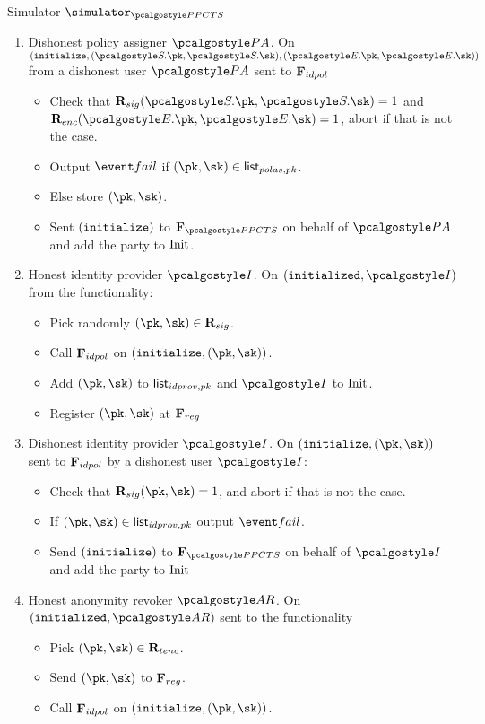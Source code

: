 \documentclass[runningheads,10pt]{llncs}
\numberwithin{equation}{section}
\begin{document}
\begin{simbox}{Simulator $\simulator_{\PPCTS}$}
\begin{enumerate}
  \item Dishonest policy assigner $\polas$. On $(\initialize, (\SIG.\pk, \SIG.\sk), (\ENC.\pk, \ENC.\sk))$ from a
    dishonest user $\polas$ sent to $\mathbf{F}_{{idpol}}$
    \begin{itemize}
    \item Check that $\REL_{sig}(\SIG.\pk, \SIG.\sk) = 1$ and
      $\REL_{enc}(\ENC.\pk, \ENC.\sk) = 1$, abort if that is not the case.
    \item Output $\fail$ if $(\pk, \sk) \in \listvar{polas, pk}$. 
    \item Else store $(\pk, \sk)$.
    \item Sent $(\mathtt{initialize})$ to $\func{\PPCTS}$ on behalf of $\polas$ and add the
      party to $\mathrm{Init}$.
    \end{itemize}

  \item Honest identity provider $\idprov$. On $(\initialized, \idprov)$ from the functionality:
    \begin{itemize}
    \item Pick randomly $(\pk, \sk) \in \REL_{sig}$.
    \item Call $\mathbf{F}_{{idpol}}$ on $(\initialize, (\pk, \sk))$.
    \item Add $(\pk, \sk)$ to ${\mathsf{list}_{idprov, pk}}$ and $\idprov$ to
      $\mathrm{Init}$.
    \item Register $(\pk, \sk)$ at $\mathbf{F}_{{reg}}$
    \end{itemize}

  \item Dishonest identity provider $\idprov$. On $(\initialize, (\pk, \sk))$
    sent to $\mathbf{F}_{{idpol}}$ by a dishonest user $\idprov$:
    \begin{itemize}
    \item Check that $\REL_{sig}(\pk, \sk) = 1$, and abort if that is not the
      case.
    \item If $(\pk, \sk) \in \listvar{idprov, pk}$ output $\fail$. 
    \item Send $(\mathtt{initialize})$ to $\func{\PPCTS}$ on behalf of $\idprov$ and add the
      party to $\mathrm{Init}$
    \end{itemize}

  \item Honest anonymity revoker $\ar$. On $(\initialized, \ar)$ sent to the
    functionality
    \begin{itemize}
    \item Pick $(\pk, \sk) \in \REL_{tenc}$.
    \item Send $(\pk, \sk)$ to $\mathbf{F}_{{reg}}$.
    \item Call $\mathbf{F}_{{idpol}}$ on $(\initialize, (\pk, \sk))$.
    \end{itemize}


\end{enumerate}
\end{simbox}
\end{document}
